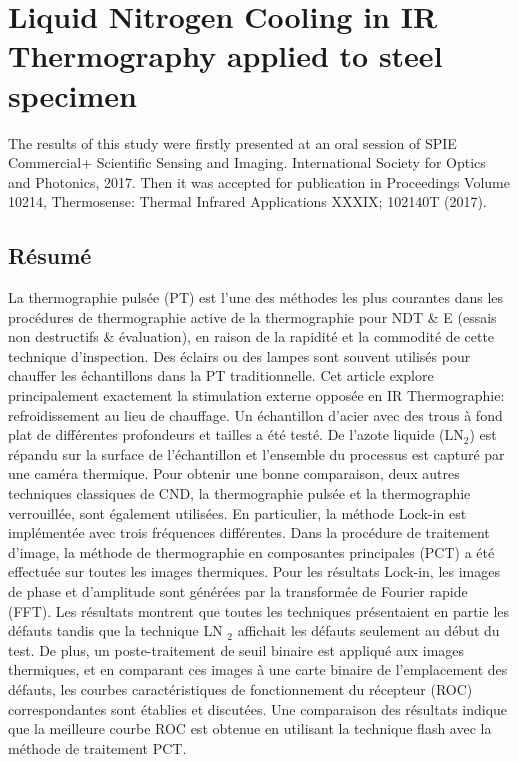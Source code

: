 \chapter{Liquid Nitrogen Cooling in IR Thermography applied to steel specimen}
The results of this study were firstly presented at an oral session of SPIE Commercial+ Scientific Sensing and Imaging. International Society for Optics and Photonics, 2017.
Then it was accepted for publication in Proceedings Volume 10214, Thermosense: Thermal Infrared Applications XXXIX; 102140T (2017).


%
\section{Résumé}
La thermographie pulsée (PT) est l'une des méthodes les plus courantes dans les procédures de thermographie active de la thermographie pour NDT \& E ​​(essais non destructifs  \& évaluation), en raison de la rapidité et la commodité de cette technique d'inspection. Des éclairs ou des lampes sont souvent utilisés pour chauffer les échantillons dans la PT traditionnelle. Cet article explore principalement exactement la stimulation externe opposée en IR Thermographie: refroidissement au lieu de chauffage. Un échantillon d'acier avec des trous à fond plat de différentes profondeurs et tailles a été testé. De l'azote liquide (LN$_2$) est répandu sur la surface de l'échantillon et l'ensemble du processus est capturé par une caméra thermique. Pour obtenir une bonne comparaison, deux autres techniques classiques de CND, la thermographie pulsée et la thermographie verrouillée, sont également utilisées. En particulier, la méthode Lock-in est implémentée avec trois fréquences différentes. Dans la procédure de traitement d'image, la méthode de thermographie en composantes principales (PCT) a été effectuée sur toutes les images thermiques. Pour les résultats Lock-in, les images de phase et d'amplitude sont générées par la transformée de Fourier rapide (FFT). Les résultats montrent que toutes les techniques présentaient en partie les défauts tandis que la technique LN $_2$ affichait les défauts seulement au début du test. De plus, un poste-traitement de seuil binaire est appliqué aux images thermiques, et en comparant ces images à une carte binaire de l'emplacement des défauts, les courbes caractéristiques de fonctionnement du récepteur (ROC) correspondantes sont établies et discutées. Une comparaison des résultats indique que la meilleure courbe ROC est obtenue en utilisant la technique flash avec la méthode de traitement PCT.

